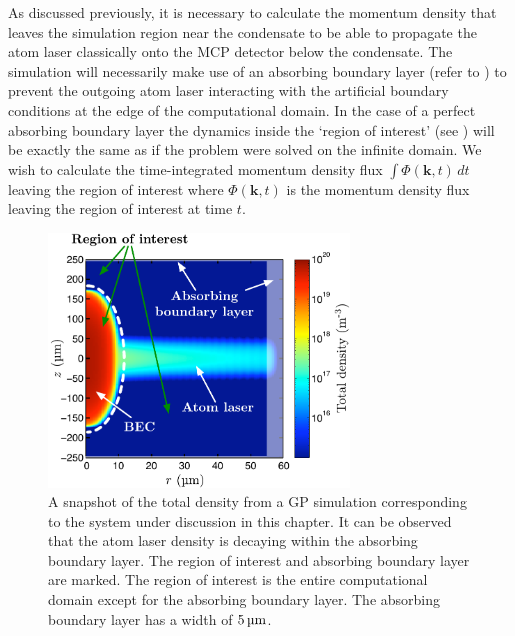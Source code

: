 As discussed previously, it is necessary to calculate the momentum density that leaves the simulation region near the condensate to be able to propagate the atom laser classically onto the MCP detector below the condensate. The simulation will necessarily make use of an absorbing boundary layer (refer to ) to prevent the outgoing atom laser interacting with the artificial boundary conditions at the edge of the computational domain.  In the case of a perfect absorbing boundary layer the dynamics inside the `region of interest' (see ) will be exactly the same as if the problem were solved on the infinite domain. We wish to calculate the time-integrated momentum density flux $\int \Phi(\bm{k}, t) \, dt$ leaving the region of interest where $\Phi(\bm{k}, t)$ is the momentum density flux leaving the region of interest at time $t$.

\begin{figure}
    \centering
    \includegraphics[width=8cm]{RegionOfInterest}
    \caption{\label{Peaks:RegionOfInterest} A snapshot of the total density from a GP simulation corresponding to the system under discussion in this chapter. It can be observed that the atom laser density is decaying within the absorbing boundary layer. The region of interest and absorbing boundary layer are marked. The region of interest is the entire computational domain except for the absorbing boundary layer. The absorbing boundary layer has a width of $\unit[5]{\micro m}$.}
\end{figure}

